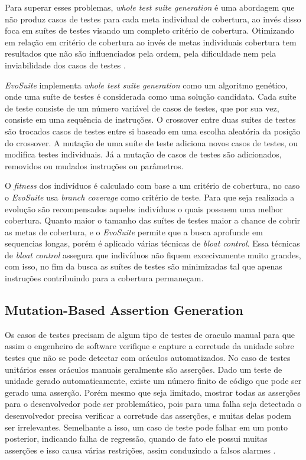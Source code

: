 \documentclass[conference]{IEEEtran}
\begin{document}
Para superar esses problemas, \textit{whole test suite generation} é uma abordagem que não produz casos de testes para cada meta individual de cobertura, ao invés disso foca em suítes de testes visando um completo critério de cobertura. Otimizando em relação em critério de cobertura ao invés de metas individuais cobertura tem resultados que não são influenciados pela ordem, pela dificuldade nem pela inviabilidade dos casos de testes \cite{fraser2011evosuite}.

\textit{EvoSuite} implementa \textit{whole test suite generation} como um algoritmo genético, onde uma suíte de testes é considerada como uma solução candidata. Cada suíte de teste consiste de um número variável de casos de testes, que por sua vez, consiste em uma sequência de instruções. O crossover entre duas suítes de testes são trocados casos de testes entre si baseado em uma escolha aleatória da posição do crossover. A mutação de uma suíte de teste adiciona novos casos de testes, ou modifica testes individuais. Já a mutação de casos de testes são adicionados, removidos ou mudados instruções ou parâmetros.

O \textit{fitness} dos indivíduos é calculado com base a um critério de cobertura, no caso o \textit{EvoSuite} usa \textit{branch coverage} como critério de teste. Para que seja realizada a evolução são recompensados aqueles indivíduos o quais possuem uma melhor cobertura. Quanto maior o tamanho das suítes de testes maior a chance de cobrir as metas de cobertura, e o \textit{EvoSuite} permite que a busca aprofunde em sequencias longas, porém é aplicado várias técnicas de \textit{bloat control}. Essa técnicas de \textit{bloat control} assegura que indivíduos não fiquem excecivamente muito grandes, com isso, no fim da busca as suítes de testes são minimizadas tal que apenas instruções contribuindo para a cobertura permaneçam.

\subsection{Mutation-Based Assertion Generation}

Os casos de testes precisam de algum tipo de testes de oraculo manual para que assim o engenheiro de software verifique e capture a corretude da unidade sobre testes que não se pode detectar com oráculos automatizados. No caso de testes unitários esses oráculos manuais geralmente são asserções. Dado um teste de unidade gerado automaticamente, existe um número finito de código que pode ser gerado uma asserção. Porém mesmo que seja limitado, mostrar todas as asserções para o desenvolvedor pode ser problemático, pois para uma falha seja detectada o desenvolvedor precisa verificar a corretude das asserções, e muitas delas podem ser irrelevantes. Semelhante a isso, um caso de teste pode falhar em um ponto posterior, indicando falha de regressão, quando de fato ele possui muitas asserções e isso causa várias restrições, assim conduzindo a falsos alarmes \cite{fraser2011evosuite}.
\end{document}
